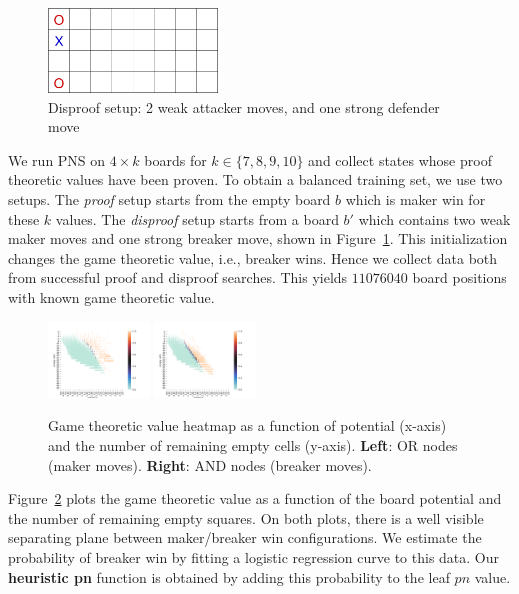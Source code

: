 \documentclass[conference]{IEEEtran}
\theoremstyle{definition}
\newcommand{\pn}{$pn$\xspace}
\begin{document}
\begin{figure}[htb]
    \centering
    \includegraphics[width = 0.4\textwidth]{papers/cog2021/disp_set.png}
    \caption{Disproof setup: 2 weak attacker moves, and one strong defender move}
    \label{fig:disproof_setup}
\end{figure}


We run PNS on $4 \times k$ boards for $k \in \{7, 8, 9, 10\}$ and collect states whose proof theoretic values have been proven. To obtain a balanced training set, we use two setups. The \emph{proof} setup starts from the empty board $b$ which is maker win for these $k$ values. The \emph{disproof} setup starts from a board $b'$ which contains two weak maker moves and one strong breaker move, shown in Figure~\ref{fig:disproof_setup}. This initialization changes the game theoretic value, i.e., breaker wins. Hence we collect data both from successful proof and disproof searches. This yields $11076040$ board positions with known game theoretic value.

\begin{figure}
    \centering
    \includegraphics[width=0.24\textwidth]{figures/pns_win_boundary_AND.png}
    \includegraphics[width=0.24\textwidth]{figures/pns_win_boundary_OR.png}
    \caption{Game theoretic value heatmap as a function of potential (x-axis) and the number of remaining empty cells (y-axis). {\bf Left}: OR nodes (maker moves). {\bf Right}: AND nodes (breaker moves).}
    \label{fig:pns_win_boundary}
\end{figure}


Figure~\ref{fig:pns_win_boundary} plots the game theoretic value as a function of the board potential and the number of remaining empty squares. On both plots, there is a well visible separating plane between maker/breaker win configurations. We estimate the probability of breaker win by fitting a logistic regression curve to this data. Our {\bf heuristic pn} function is obtained by adding this probability to the leaf \pn value.
\end{document}
